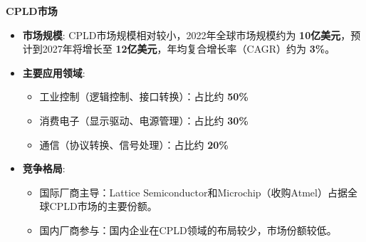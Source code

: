 \documentclass[
  ignorenonframetext,
  chinese,
]{beamer}
\providecommand{\tightlist}{%
  \setlength{\itemsep}{0pt}\setlength{\parskip}{0pt}}
\begin{document}
\begin{frame}
\begin{block}{\textbf{CPLD市场}}
\label{cpldux5e02ux573a}
\begin{itemize}
\tightlist
\item
  \textbf{市场规模}: CPLD市场规模相对较小，2022年全球市场规模约为
  \textbf{10亿美元}，预计到2027年将增长至
  \textbf{12亿美元}，年均复合增长率（CAGR）约为 \textbf{3\%}。
\item
  \textbf{主要应用领域}:

  \begin{itemize}
  \tightlist
  \item
    工业控制（逻辑控制、接口转换）：占比约 \textbf{50\%}\\
  \item
    消费电子（显示驱动、电源管理）：占比约 \textbf{30\%}\\
  \item
    通信（协议转换、信号处理）：占比约 \textbf{20\%}\\
  \end{itemize}
\item
  \textbf{竞争格局}:

  \begin{itemize}
  \tightlist
  \item
    国际厂商主导：Lattice
    Semiconductor和Microchip（收购Atmel）占据全球CPLD市场的主要份额。\\
  \item
    国内厂商参与：国内企业在CPLD领域的布局较少，市场份额较低。
  \end{itemize}
\end{itemize}
\end{block}
\end{frame}
\end{document}
